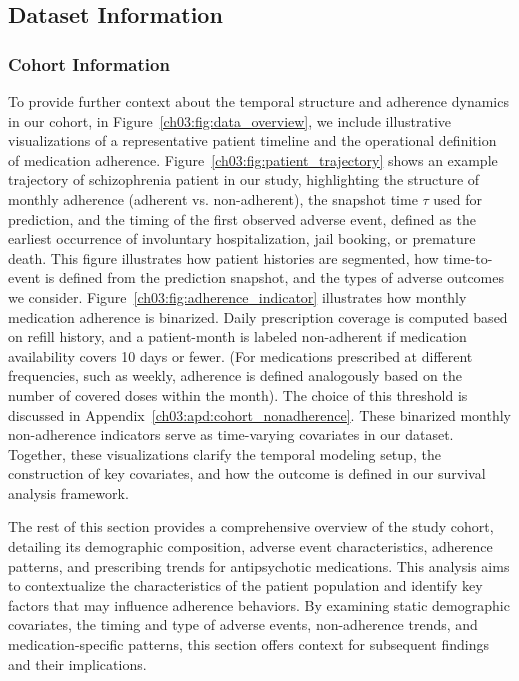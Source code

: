 \subsection{Dataset Information}\ChThreeHeadingOnly
\label{ch03:apd:dataset_information}




\subsubsection{Cohort Information}
\label{ch03:apd:cohort_information}
To provide further context about the temporal structure and adherence dynamics in our cohort, in Figure~\ref{ch03:fig:data_overview}, we include illustrative visualizations of a representative patient timeline and the operational definition of medication adherence. 
Figure~\ref{ch03:fig:patient_trajectory} shows an example trajectory of schizophrenia patient in our study, highlighting the structure of monthly adherence (adherent vs. non-adherent), the snapshot time \(\tau\) used for prediction, and the timing of the first observed adverse event, defined as the earliest occurrence of involuntary hospitalization, jail booking, or premature death. 
This figure illustrates how patient histories are segmented, how time-to-event is defined from the prediction snapshot, and the types of adverse outcomes we consider.
Figure~\ref{ch03:fig:adherence_indicator} illustrates how monthly medication adherence is binarized. 
Daily prescription coverage is computed based on refill history, and a patient-month is labeled non-adherent if medication availability covers 10 days or fewer. 
(For medications prescribed at different frequencies, such as weekly, adherence is defined analogously based on the number of covered doses within the month).
The choice of this threshold is discussed in Appendix~\ref{ch03:apd:cohort_nonadherence}.
These binarized monthly non-adherence indicators serve as time-varying covariates in our dataset.
Together, these visualizations clarify the temporal modeling setup, the construction of key covariates, and how the outcome is defined in our survival analysis framework.





The rest of this section provides a comprehensive overview of the study cohort, detailing its demographic composition, adverse event characteristics, adherence patterns, and prescribing trends for antipsychotic medications. 
This analysis aims to contextualize the characteristics of the patient population and identify key factors that may influence adherence behaviors. 
By examining static demographic covariates, the timing and type of adverse events, non-adherence trends, and medication-specific patterns, this section offers context for subsequent findings and their implications.

